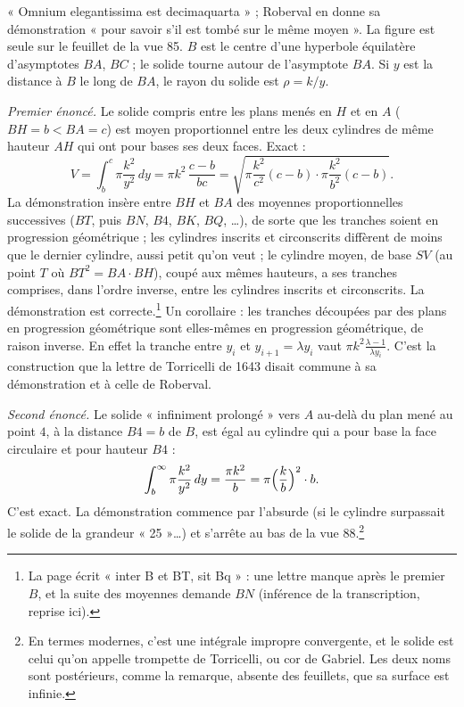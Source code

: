 \documentclass[11pt,a4paper]{article}
\begin{document}
« Omnium elegantissima est decimaquarta » ; Roberval en donne sa démonstration
« pour savoir s'il est tombé sur le même moyen ». La figure est seule sur le
feuillet de la vue 85. $B$ est le centre d'une hyperbole équilatère d'asymptotes
$BA$, $BC$ ; le solide tourne autour de l'asymptote $BA$. Si $y$ est la distance
à $B$ le long de $BA$, le rayon du solide est $\rho = k/y$.

\emph{Premier énoncé.} Le solide compris entre les plans menés en $H$ et en $A$
($BH = b < BA = c$) est moyen proportionnel entre les deux cylindres de même
hauteur $AH$ qui ont pour bases ses deux faces. Exact :
\[
V = \int_b^c \pi\frac{k^2}{y^2}\,dy = \pi k^2\,\frac{c-b}{bc}
= \sqrt{\pi\frac{k^2}{c^2}(c-b)\cdot\pi\frac{k^2}{b^2}(c-b)} .
\]
La démonstration insère entre $BH$ et $BA$ des moyennes proportionnelles
successives ($BT$, puis $BN$, $B4$, $BK$, $BQ$, \ldots), de sorte que les
tranches soient en progression géométrique ; les cylindres inscrits et
circonscrits diffèrent de moins que le dernier cylindre, aussi petit qu'on veut ;
le cylindre moyen, de base $SV$ (au point $T$ où $BT^2 = BA\cdot BH$), coupé aux
mêmes hauteurs, a ses tranches comprises, dans l'ordre inverse, entre les
cylindres inscrits et circonscrits. La démonstration est correcte.\footnote{La
page écrit « inter B et BT, sit Bq » : une lettre manque après le premier $B$, et
la suite des moyennes demande $BN$ (inférence de la transcription, reprise
ici).} Un corollaire : les tranches découpées par des plans en progression
géométrique sont elles-mêmes en progression géométrique, de raison inverse. En
effet la tranche entre $y_i$ et $y_{i+1} = \lambda y_i$ vaut
$\pi k^2\frac{\lambda-1}{\lambda y_i}$. C'est la construction que la lettre de
Torricelli de 1643 disait commune à sa démonstration et à celle de Roberval.

\emph{Second énoncé.} Le solide « infiniment prolongé » vers $A$ au-delà du plan
mené au point $4$, à la distance $B4 = b$ de $B$, est égal au cylindre qui a pour
base la face circulaire et pour hauteur $B4$ :
\[
\int_b^{\infty}\pi\frac{k^2}{y^2}\,dy = \frac{\pi k^2}{b} = \pi\Bigl(\frac kb\Bigr)^2\cdot b .
\]
C'est exact. La démonstration commence par l'absurde (si le cylindre surpassait le
solide de la grandeur « 25 »\ldots) et s'arrête au bas de la vue 88.\footnote{En
termes modernes, c'est une intégrale impropre convergente, et le solide est
celui qu'on appelle trompette de Torricelli, ou cor de Gabriel. Les deux noms
sont postérieurs, comme la remarque, absente des feuillets, que sa surface est
infinie.}
\end{document}
